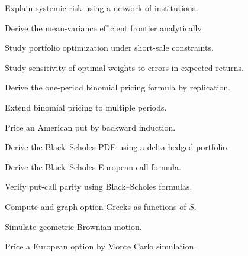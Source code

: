 \begin{exercise}[3]
Explain systemic risk using a network of institutions.
\end{exercise}

\begin{exercise}[4]
Derive the mean-variance efficient frontier analytically.
\end{exercise}

\begin{exercise}[4]
Study portfolio optimization under short-sale constraints.
\end{exercise}

\begin{exercise}[4]
Study sensitivity of optimal weights to errors in expected returns.
\end{exercise}

\begin{exercise}[4]
Derive the one-period binomial pricing formula by replication.
\end{exercise}

\begin{exercise}[4]
Extend binomial pricing to multiple periods.
\end{exercise}

\begin{exercise}[4]
Price an American put by backward induction.
\end{exercise}

\begin{exercise}[4]
Derive the Black--Scholes PDE using a delta-hedged portfolio.
\end{exercise}

\begin{exercise}[4]
Derive the Black--Scholes European call formula.
\end{exercise}

\begin{exercise}[4]
Verify put-call parity using Black--Scholes formulas.
\end{exercise}

\begin{exercise}[4]
Compute and graph option Greeks as functions of \(S\).
\end{exercise}

\begin{exercise}[4]
Simulate geometric Brownian motion.
\end{exercise}

\begin{exercise}[4]
Price a European option by Monte Carlo simulation.
\end{exercise}

